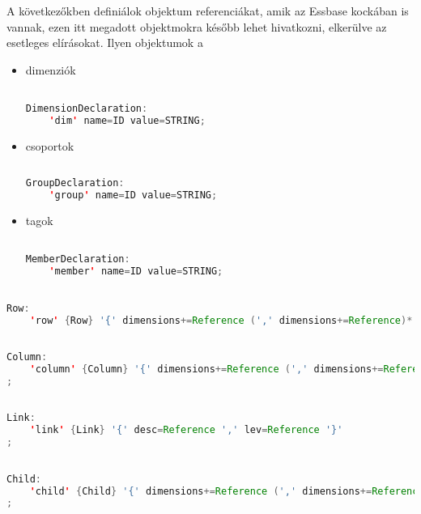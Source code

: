 A következőkben definiálok objektum referenciákat, amik az Essbase kockában is vannak, ezen itt megadott objektmokra később lehet hivatkozni, elkerülve az esetleges elírásokat. Ilyen objektumok a

\begin{itemize}
  \item dimenziók
\begin{lstlisting}[language=java,morekeywords={generate,dim,group,row,link,reportParameter,report,query},alsoletter={-},breaklines=true]

DimensionDeclaration:
	'dim' name=ID value=STRING;

\end{lstlisting}
  \item csoportok
\begin{lstlisting}[language=java,morekeywords={generate,dim,group,row,link,reportParameter,report,query},alsoletter={-},breaklines=true]
  
GroupDeclaration:
	'group' name=ID value=STRING;
\end{lstlisting}
  \item tagok
\begin{lstlisting}[language=java,morekeywords={generate,dim,group,row,link,reportParameter,report,query},alsoletter={-},breaklines=true]

MemberDeclaration:
	'member' name=ID value=STRING;

\end{lstlisting}

\end{itemize}

\begin{lstlisting}[language=java,morekeywords={generate,dim,group,row,link,reportParameter,report,query},alsoletter={-},breaklines=true]

Row:
	'row' {Row} '{' dimensions+=Reference (',' dimensions+=Reference)* '}';

\end{lstlisting}
\begin{lstlisting}[language=java,morekeywords={generate,dim,group,row,link,reportParameter,report,query},alsoletter={-},breaklines=true]

Column:
	'column' {Column} '{' dimensions+=Reference (',' dimensions+=Reference)* '}'
; 	
\end{lstlisting}
\begin{lstlisting}[language=java,morekeywords={generate,dim,group,row,link,reportParameter,report,query},alsoletter={-},breaklines=true]

Link:
	'link' {Link} '{' desc=Reference ',' lev=Reference '}'
; 	

\end{lstlisting}
\begin{lstlisting}[language=java,morekeywords={generate,dim,group,row,link,reportParameter,report,query},alsoletter={-},breaklines=true]

Child:
	'child' {Child} '{' dimensions+=Reference (',' dimensions+=Reference)* '}'
; 
\end{lstlisting}

